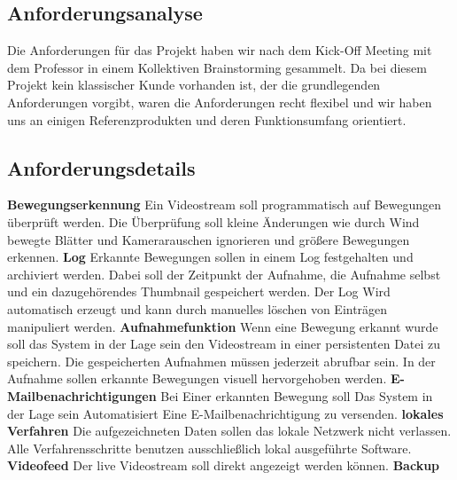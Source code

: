 \subsection{Anforderungsanalyse}
Die Anforderungen für das Projekt haben wir nach dem Kick-Off Meeting mit dem Professor in einem Kollektiven Brainstorming gesammelt. Da bei diesem Projekt kein klassischer Kunde vorhanden ist, der die grundlegenden Anforderungen vorgibt, waren die Anforderungen recht flexibel und wir haben uns an einigen Referenzprodukten und deren Funktionsumfang orientiert.
\subsection{Anforderungsdetails}
\textbf{Bewegungserkennung}\newline
Ein Videostream soll programmatisch auf Bewegungen überprüft werden. Die Überprüfung soll kleine Änderungen wie durch Wind bewegte Blätter und Kamerarauschen ignorieren und größere Bewegungen erkennen.
\newline
\textbf{Log}\newline
Erkannte Bewegungen sollen in einem Log festgehalten und archiviert werden.
Dabei soll der Zeitpunkt der Aufnahme, die Aufnahme selbst und ein dazugehörendes Thumbnail gespeichert werden. Der Log Wird automatisch erzeugt und kann durch manuelles löschen von Einträgen manipuliert werden.
\newline
\textbf{Aufnahmefunktion}\newline
Wenn eine Bewegung erkannt wurde soll das System in der Lage sein den Videostream in einer persistenten Datei zu speichern.
Die gespeicherten Aufnahmen müssen jederzeit abrufbar sein.
In der Aufnahme sollen erkannte Bewegungen visuell hervorgehoben werden.
\newline
\textbf{E-Mailbenachrichtigungen}\newline
Bei Einer erkannten Bewegung soll Das System in der Lage sein Automatisiert Eine E-Mailbenachrichtigung zu versenden.
\newline
\textbf{lokales Verfahren}\newline
Die aufgezeichneten Daten sollen das lokale Netzwerk nicht verlassen.
Alle Verfahrensschritte benutzen ausschließlich lokal ausgeführte Software.
\newline
\textbf{Videofeed}\newline
Der live Videostream soll direkt angezeigt werden können.
\newline
\textbf{Backup}\newline
